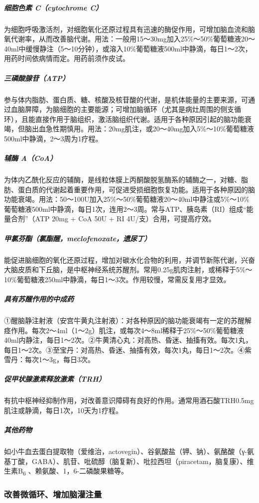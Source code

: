 \subparagraph{细胞色素 C（cytochrome C）}

为细胞呼吸激活剂，对细胞氧化还原过程具有迅速的酶促作用，可增加脑血流和脑氧代谢率，从而改善脑代谢。用法：一般用15～30mg加入25\%～50\%葡萄糖液20～40ml中缓慢静注（5～10分钟），或溶入10\%葡萄糖液500ml中静滴，每日1～2次，用药时间依病情而定。用药前须作皮试。

\subparagraph{三磷酸腺苷（ATP）}

参与体内脂肪、蛋白质、糖、核酸及核苷酸的代谢，是机体能量的主要来源，可通过血脑屏障，为脑细胞的主要能源；可增加脑循环（尤其是病灶周围的侧支循环），且能直接作用于脑组织，激活脑组织代谢。适用于各种原因引起的脑功能衰竭，但脑出血急性期慎用。用法：20mg肌注，或20～40mg加入5\%～10\%葡萄糖液500ml中静滴，2～3周为1疗程。

\subparagraph{辅酶 A（CoA）}

为体内乙酰化反应的辅酶，是线粒体膜上丙酮酸脱氢酶系的辅酶之一，对糖、脂肪、蛋白质的代谢起着重要作用，可促进受损细胞恢复功能。适用于各种原因的脑功能衰竭。用法：50～100U加入25\%～50\%葡萄糖液20～40ml中静注或5\%～10\%葡萄糖液500ml中静滴，每日1次，连用2～3周。常与ATP、胰岛素（RI）组成“能量合剂”（ATP
20mg + CoA 50U + RI 4U/支）合用，可提高疗效。

\subparagraph{甲氯芬酯（氯酯醒，meclofenoxate，遗尿丁）}

能促进脑细胞的氧化还原过程，增加对碳水化合物的利用，并调节新陈代谢，兴奋大脑皮质和下丘脑，是中枢神经系统苏醒剂。常用0.25g肌肉注射，或稀释于5\%～10\%葡萄糖液250ml中静滴，每日1～3次。作用较慢，常需反复用才显效。

\subparagraph{具有苏醒作用的中成药}

①醒脑静注射液（安宫牛黄丸注射液）：对各种原因的脑功能衰竭有一定的苏醒解痉作用。每次2～4ml（1～2g）肌注，或每次4～8ml稀释于25\%～50\%葡萄糖液40ml内静注，每日1～2次。②牛黄清心丸：对高热、昏迷、抽搐有效。每次1丸，每日1～2次。③至宝丹：对高热、昏迷、抽搐有效，每次1丸，每日1～2次。④紫雪丹：每次1～3g，每日3次。

\subparagraph{促甲状腺激素释放激素（TRH）}

有抗中枢神经抑制作用，对改善意识障碍有良好的作用。通常用酒石酸TRH0.5mg肌注或静滴，每日1次，10天为1疗程。

\subparagraph{其他药物}

如小牛血去蛋白提取物（爱维治，actovegin）、谷氨酸盐（钾、钠）、氨酪酸（γ-氨基丁酸，GABA）、肌苷、吡硫醇（脑复新）、吡拉西坦（piracetam，脑复康）、维生素B\textsubscript{6}
、赖氨酸、1，6-二磷酸果糖等。

\subsubsection{改善微循环、增加脑灌注量}

